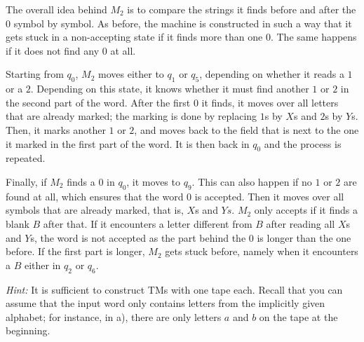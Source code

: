 \documentclass{exercise}
\begin{document}
\begin{solution}
\begin{center}
    \end{center}
    The overall idea behind $M_2$ is to compare the strings it finds before and
    after the $0$ symbol by symbol.  As before, the machine is constructed in
    such a way that it gets stuck in a non-accepting state if it finds more
    than one $0$.  The same happens if it does not find any $0$ at all.
  
    Starting from $q_0$, $M_2$ moves either to $q_1$ or $q_5$, depending on whether
    it reads a $1$ or a $2$.  Depending on this state, it knows whether it must
    find another $1$ or $2$ in the second part of the word.  After the first $0$
    it finds, it moves over all letters that are already marked; the marking is
    done by replacing $1$s by $X$s and $2$s by $Y$s.  Then, it marks
    another $1$ or $2$, and moves back to the field that is next to the one it
    marked in the first part of the word.  It is then back in $q_0$ and the
    process is repeated.
  
    Finally, if $M_2$ finds a $0$ in $q_0$, it moves to $q_9$.  This can also
    happen if no $1$ or $2$ are found at all, which ensures that the word $0$ is
    accepted.  Then it moves over all symbols that are already marked, that is,
    $X$s and $Ys$.  $M_2$ only accepts if it finds a blank $B$ after that.  If it
    encounters a letter different from $B$ after reading all $X$s and $Y$s, the
    word is not accepted as the part behind the $0$ is longer than the one
    before.  If the first part is longer, $M_2$ gets stuck before, namely when it
    encounters a $B$ either in $q_2$ or $q_6$.
  \end{solution}

\nosubtask \textit{Hint:} It is sufficient to construct TMs with one tape each.
Recall that you can assume that the input word only contains letters from the
implicitly given alphabet; for instance, in a), there are only letters $a$ and
$b$ on the tape at the beginning.

\end{document}
